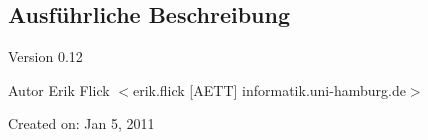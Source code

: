 \subsection{Ausführliche Beschreibung}
\begin{DoxyVersion}{Version}
0.12 
\end{DoxyVersion}
\begin{DoxyAuthor}{Autor}
Erik Flick $<$erik.flick \mbox{[}AETT\mbox{]} informatik.uni-\/hamburg.de$>$
\end{DoxyAuthor}
Created on: Jan 5, 2011 